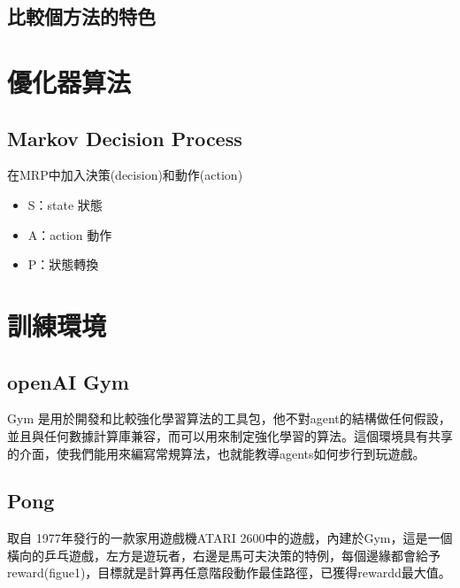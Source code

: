 \documentclass[14pt,a4paper]{report}  %
\begin{document}
\section{比較個方法的特色}
\newpage
\chapter{優化器算法}
\section{Markov Decision Process}
\quad 在MRP中加入決策(decision)和動作(action)\\
\begin{itemize}
\item S：state 狀態
\item A：action 動作
\item P：狀態轉換\\[6pt]
\begin{center}
\hspace{-4em}
\end{center}

\end{itemize}
\newpage
\chapter{訓練環境}
\section{openAI Gym}
\qquad Gym 是用於開發和比較強化學習算法的工具包，他不對agent的結構做任何假設，並且與任何數據計算庫兼容，而可以用來制定強化學習的算法。這個環境具有共享的介面，使我們能用來編寫常規算法，也就能教導agents如何步行到玩遊戲。\\[6pt]


\section{Pong}
\qquad 取自 1977年發行的一款家用遊戲機ATARI 2600中的遊戲，內建於Gym，這是一個橫向的乒乓遊戲，左方是遊玩者，右邊是馬可夫決策的特例，每個邊緣都會給予reward(figue1)，目標就是計算再任意階段動作最佳路徑，已獲得rewardd最大值。
\end{document}
